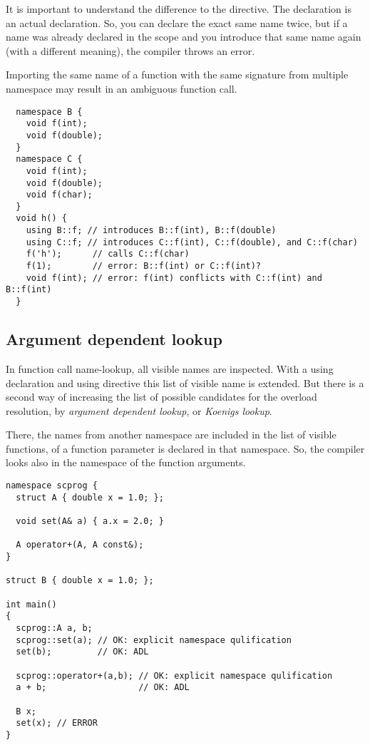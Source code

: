 It is important to understand the difference to the  directive. The  declaration is an actual declaration. So, you can
declare the exact same name twice, but if a name was already declared in the scope and you introduce that same name again (with a different meaning),
the compiler throws an error.

Importing the same name of a function with the same signature from multiple namespace may result in an ambiguous function call.
\begin{verbatim}
  namespace B {
    void f(int);
    void f(double);
  }
  namespace C {
    void f(int);
    void f(double);
    void f(char);
  }
  void h() {
    using B::f; // introduces B::f(int), B::f(double)
    using C::f; // introduces C::f(int), C::f(double), and C::f(char)
    f('h');      // calls C::f(char)
    f(1);        // error: B::f(int) or C::f(int)?
    void f(int); // error: f(int) conflicts with C::f(int) and B::f(int)
  }
\end{verbatim}

\subsection{Argument dependent lookup\label{sec:adl}}
In function call name-lookup, all visible names are inspected. With a using declaration and using directive this list of visible name is extended. But
there is a second way of increasing the list of possible candidates for the overload resolution, by \emph{argument dependent lookup}, or \emph{Koenigs lookup}.

There, the names from another namespace are included in the list of visible functions, of a function parameter is declared in that namespace. So, the
compiler looks also in the namespace of the function arguments.
%
\begin{verbatim}
namespace scprog {
  struct A { double x = 1.0; };

  void set(A& a) { a.x = 2.0; }

  A operator+(A, A const&);
}

struct B { double x = 1.0; };

int main()
{
  scprog::A a, b;
  scprog::set(a); // OK: explicit namespace qulification
  set(b);         // OK: ADL

  scprog::operator+(a,b); // OK: explicit namespace qulification
  a + b;                  // OK: ADL

  B x;
  set(x); // ERROR
}
\end{verbatim}

